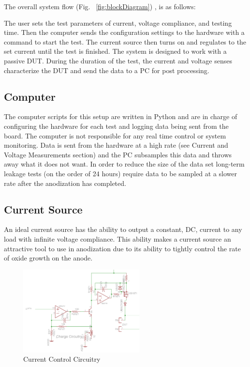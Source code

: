 \documentclass[journal]{IEEEtran}
\begin{document}
The overall system flow (Fig. ~\ref{fig:blockDiagram}) , is as follows:

The user sets the test parameters of current, voltage compliance, and testing time. Then the computer sends the configuration settings to the hardware with a command to start the test. The current source then turns on and regulates to the set current until the test is finished. The system is designed to work with a passive DUT. During the duration of the test, the current and voltage senses characterize the DUT and send the data to a PC for post processing.

\subsection{Computer}

The computer scripts for this setup are written in Python and are in charge of configuring the hardware for each test and logging data being sent from the board. The computer is not responsible for any real time control or system monitoring. Data is sent from the hardware at a high rate (see Current and Voltage Measurements section) and the PC subsamples this data and throws away what it does not want. In order to reduce the size of the data set long-term leakage tests (on the order of 24 hours) require data to be sampled at a slower rate after the anodization has completed.


\subsection{Current Source}

An ideal current source has the ability to output a constant, DC, current to any load with infinite voltage compliance. This ability makes a current source an attractive tool to use in anodization due to its ability to tightly control the rate of oxide growth on the anode.

\begin{figure}[here]
\centering
\includegraphics[width=2.5in]{currentMirror}
\caption{Current Control Circuitry}
\label{fig:currentMirror}
\end{figure}
\end{document}
